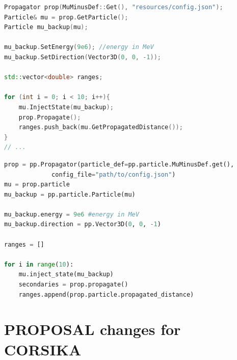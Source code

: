 \documentclass[aspectratio=1610, captions=tableheading, 11pt]{beamer}
\begin{document}
\begin{frame}[fragile]
  \vspace{-10mm}
\begin{lstlisting}[language=C++,basicstyle=\ttfamily,keywordstyle=\color{red}, escapechar=\!]
Propagator prop(MuMinusDef::Get(), "resources/config.json");
Particle& mu = prop.GetParticle();
Particle mu_backup(mu);

mu_backup.SetEnergy(9e6); //energy in MeV
mu_backup.SetDirection(Vector3D(0, 0, -1));

std::vector<double> ranges;

for (int i = 0; i < 10; i++){
    mu.InjectState(mu_backup);
    prop.Propagate();  
    ranges.push_back(mu.GetPropagatedDistance());
}
// ...
\end{lstlisting}
\end{frame}

\begin{frame}[fragile]
  \vspace{-10mm}
\begin{lstlisting}[language=python,basicstyle=\ttfamily,keywordstyle=\color{red}, escapechar=\!]
prop = pp.Propagator(particle_def=pp.particle.MuMinusDef.get(), 
		     config_file="path/to/config.json")
mu = prop.particle
mu_backup = pp.particle.Particle(mu)

mu_backup.energy = 9e6 #energy in MeV
mu_backup.direction = pp.Vector3D(0, 0, -1)

ranges = []

for i in range(10):
    mu.inject_state(mu_backup)
    secondaries = prop.propagate()
    ranges.append(prop.particle.propagated_distance)
\end{lstlisting}

\end{frame}


\section{PROPOSAL changes for CORSIKA}
\end{document}
